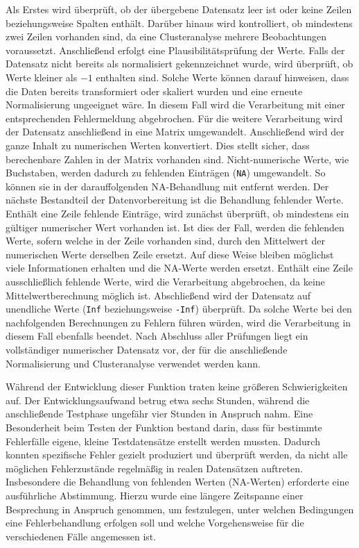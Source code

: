 \documentclass[12pt]{article}
\begin{document}
Als Erstes wird überprüft, ob der übergebene Datensatz leer ist oder keine Zeilen beziehungsweise Spalten enthält. Darüber hinaus wird kontrolliert, ob mindestens zwei Zeilen vorhanden sind, da eine Clusteranalyse mehrere Beobachtungen voraussetzt.
Anschließend erfolgt eine Plausibilitätsprüfung der Werte. Falls der Datensatz nicht bereits als normalisiert gekennzeichnet wurde, wird überprüft, ob Werte kleiner als $-1$ enthalten sind. Solche Werte können darauf hinweisen, dass die Daten bereits transformiert oder skaliert wurden und eine erneute Normalisierung ungeeignet wäre. In diesem Fall wird die Verarbeitung mit einer entsprechenden Fehlermeldung abgebrochen.
Für die weitere Verarbeitung wird der Datensatz anschließend in eine Matrix umgewandelt. Anschließend wird der ganze Inhalt zu numerischen Werten konvertiert. Dies stellt sicher, dass berechenbare Zahlen in der Matrix vorhanden sind. Nicht-numerische Werte, wie Buchstaben, werden dadurch zu fehlenden Einträgen (\texttt{NA}) umgewandelt. So können sie in der darauffolgenden NA-Behandlung mit entfernt werden.
Der nächste Bestandteil der Datenvorbereitung ist die Behandlung fehlender Werte. Enthält eine Zeile fehlende Einträge, wird zunächst überprüft, ob mindestens ein gültiger numerischer Wert vorhanden ist. Ist dies der Fall, werden die fehlenden Werte, sofern welche in der Zeile vorhanden sind, durch den Mittelwert der numerischen Werte derselben Zeile ersetzt. Auf diese Weise bleiben möglichst viele Informationen erhalten und die NA-Werte werden ersetzt. Enthält eine Zeile ausschließlich fehlende Werte, wird die Verarbeitung abgebrochen, da keine Mittelwertberechnung möglich ist.
Abschließend wird der Datensatz auf unendliche Werte (\texttt{Inf} beziehungsweise \texttt{-Inf}) überprüft. Da solche Werte bei den nachfolgenden Berechnungen zu Fehlern führen würden, wird die Verarbeitung in diesem Fall ebenfalls beendet. Nach Abschluss aller Prüfungen liegt ein vollständiger numerischer Datensatz vor, der für die anschließende Normalisierung und Clusteranalyse verwendet werden kann.

Während der Entwicklung dieser Funktion traten keine größeren Schwierigkeiten auf. Der Entwicklungsaufwand betrug etwa sechs Stunden, während die anschließende Testphase ungefähr vier Stunden in Anspruch nahm. Eine Besonderheit beim Testen der Funktion bestand darin, dass für bestimmte Fehlerfälle eigene, kleine Testdatensätze erstellt werden mussten. Dadurch konnten spezifische Fehler gezielt produziert und überprüft werden, da nicht alle möglichen Fehlerzustände regelmäßig in realen Datensätzen auftreten. Insbesondere die Behandlung von fehlenden Werten (NA-Werten) erforderte eine ausführliche Abstimmung. Hierzu wurde eine längere Zeitspanne einer Besprechung in Anspruch genommen, um festzulegen, unter welchen Bedingungen eine Fehlerbehandlung erfolgen soll und welche Vorgehensweise für die verschiedenen Fälle angemessen ist.
\end{document}
